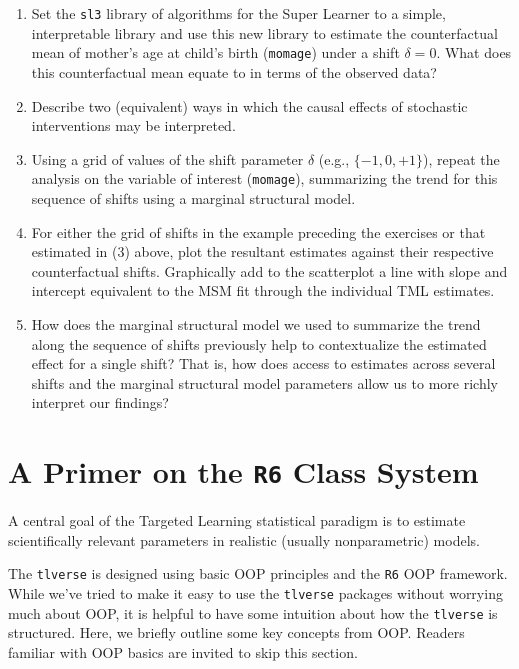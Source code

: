 \documentclass[
  12pt, krantz2,
]{book}
\newcommand{\passthrough}[1]{#1}
\theoremstyle{definition}
\theoremstyle{definition}
\theoremstyle{definition}
\newcommand{\1}{\mathbbm{1}}
\begin{document}
\begin{enumerate}
\def\labelenumi{\arabic{enumi}.}
\item
  Set the \passthrough{\lstinline!sl3!} library of algorithms for the Super Learner to a simple,
  interpretable library and use this new library to estimate the counterfactual
  mean of mother's age at child's birth (\passthrough{\lstinline!momage!}) under a shift \(\delta = 0\).
  What does this counterfactual mean equate to in terms of the observed data?
\item
  Describe two (equivalent) ways in which the causal effects of stochastic
  interventions may be interpreted.
\item
  Using a grid of values of the shift parameter \(\delta\) (e.g., \(\{-1, 0, +1\}\)), repeat the analysis on the variable of interest (\passthrough{\lstinline!momage!}),
  summarizing the trend for this sequence of shifts using a marginal structural
  model.
\item
  For either the grid of shifts in the example preceding the exercises or that
  estimated in (3) above, plot the resultant estimates against their respective
  counterfactual shifts. Graphically add to the scatterplot a line with slope
  and intercept equivalent to the MSM fit through the individual TML estimates.
\item
  How does the marginal structural model we used to summarize the trend along
  the sequence of shifts previously help to contextualize the estimated effect
  for a single shift? That is, how does access to estimates across several
  shifts and the marginal structural model parameters allow us to more richly
  interpret our findings?
\end{enumerate}

\hypertarget{r6}{%
\chapter{\texorpdfstring{A Primer on the \texttt{R6} Class System}{A Primer on the R6 Class System}}\label{r6}}

A central goal of the Targeted Learning statistical paradigm is to estimate
scientifically relevant parameters in realistic (usually nonparametric) models.

The \passthrough{\lstinline!tlverse!} is designed using basic OOP principles and the \passthrough{\lstinline!R6!} OOP framework.
While we've tried to make it easy to use the \passthrough{\lstinline!tlverse!} packages without worrying
much about OOP, it is helpful to have some intuition about how the \passthrough{\lstinline!tlverse!} is
structured. Here, we briefly outline some key concepts from OOP. Readers
familiar with OOP basics are invited to skip this section.
\end{document}
